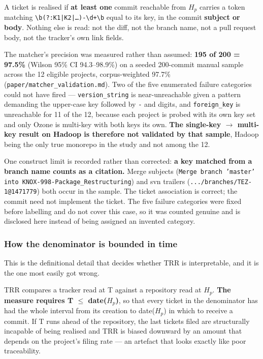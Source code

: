 \documentclass[conference]{IEEEtran}
\begin{document}
A ticket is realised if \textbf{at least one} commit reachable from $H_p$ carries a token matching \texttt{\textbackslash{}b(?:K1|K2|\ldots{})-\allowbreak{}\textbackslash{}d+\textbackslash{}b} equal to its key, in the commit \textbf{subject or body}. Nothing else is read: not the diff, not the branch name, not a pull request body, not the tracker's own link fields.

The matcher's precision was measured rather than assumed: \textbf{195 of 200 = 97.5\%} (Wilson 95\% CI 94.3--98.9\%) on a seeded 200-commit manual sample across the 12 eligible projects, corpus-weighted 97.7\% (\texttt{paper/\allowbreak{}matcher\_\allowbreak{}validation.\allowbreak{}md}). Two of the five enumerated failure categories could not have fired --- \texttt{version\_\allowbreak{}string} is near-unreachable given a pattern demanding the upper-case key followed by \texttt{-\allowbreak{}} and digits, and \texttt{foreign\_\allowbreak{}key} is unreachable for 11 of the 12, because each project is probed with its own key set and only Ozone is multi-key with both keys its own. \textbf{The single-key $\rightarrow$ multi-key result on Hadoop is therefore not validated by that sample}, Hadoop being the only true monorepo in the study and not among the 12.

One construct limit is recorded rather than corrected: \textbf{a key matched from a branch name counts as a citation.} Merge subjects (\texttt{Merge branch 'master' into KNOX-\allowbreak{}998-\allowbreak{}Package\_\allowbreak{}Restructuring}) and svn trailers (\texttt{.\allowbreak{}.\allowbreak{}.\allowbreak{}/\allowbreak{}branches/\allowbreak{}TEZ-\allowbreak{}1@1471779}) both occur in the sample. The ticket association is correct; the commit need not implement the ticket. The five failure categories were fixed before labelling and do not cover this case, so it was counted genuine and is disclosed here instead of being assigned an invented category.

\subsubsection{How the denominator is bounded in time}
\label{sec:3.1.3}

This is the definitional detail that decides whether TRR is interpretable, and it is the one most easily got wrong.

TRR compares a tracker read at T against a repository read at $H_p$. \textbf{The measure requires T $\leq$ date($H_p$)}, so that every ticket in the denominator has had the whole interval from its creation to date($H_p$) in which to receive a commit. If T runs ahead of the repository, the last tickets filed are structurally incapable of being realised and TRR is biased downward by an amount that depends on the project's filing rate --- an artefact that looks exactly like poor traceability.
\end{document}
